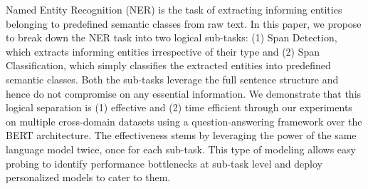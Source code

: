 Named Entity Recognition (NER) is the task of extracting informing entities belonging to predefined semantic classes from raw text. In this paper, we propose to break down the NER task into two logical sub-tasks: (1) Span Detection, which extracts informing entities irrespective of their type and (2) Span Classification, which simply classifies the extracted entities into predefined semantic classes. Both the sub-tasks leverage the full sentence structure and hence do not compromise on any essential information. We demonstrate that this logical separation is (1) effective and (2) time efficient through our experiments on multiple cross-domain datasets using a question-answering framework over the BERT architecture. The effectiveness stems by leveraging the power of the same language model twice, once for each sub-task. This type of modeling allows easy probing to identify performance bottlenecks at sub-task level and deploy personalized models to cater to them.
